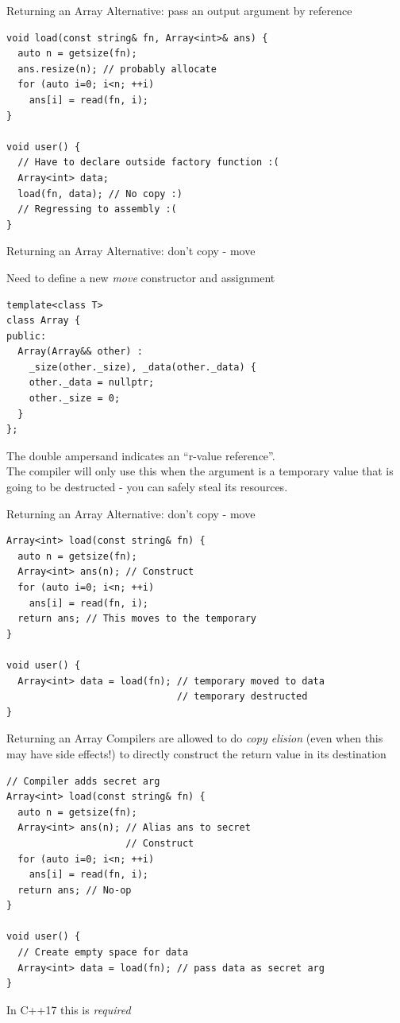 \documentclass[presentation,t]{beamer}
\begin{document}
\begin{frame}[fragile]{Returning an Array}
  Alternative: pass an output argument by reference
\begin{lstlisting}
void load(const string& fn, Array<int>& ans) {
  auto n = getsize(fn);
  ans.resize(n); // probably allocate
  for (auto i=0; i<n; ++i)
    ans[i] = read(fn, i);
}

void user() {
  // Have to declare outside factory function :(
  Array<int> data;
  load(fn, data); // No copy :)
  // Regressing to assembly :(
}
\end{lstlisting}
\end{frame}

\begin{frame}[fragile]{Returning an Array}
  Alternative: don't copy - move

  Need to define a new \emph{move} constructor and assignment

\begin{lstlisting}
template<class T>
class Array {
public:
  Array(Array&& other) :
    _size(other._size), _data(other._data) {
    other._data = nullptr;
    other._size = 0;
  }
};
\end{lstlisting}

  The double ampersand indicates an ``r-value reference''. \\
  The compiler will only use this when the argument is a temporary
  value that is going to be destructed - you can safely steal its
  resources.
\end{frame}


\begin{frame}[fragile]{Returning an Array}
  Alternative: don't copy - move
\begin{lstlisting}
Array<int> load(const string& fn) {
  auto n = getsize(fn);
  Array<int> ans(n); // Construct
  for (auto i=0; i<n; ++i)
    ans[i] = read(fn, i);
  return ans; // This moves to the temporary
}

void user() {
  Array<int> data = load(fn); // temporary moved to data
                              // temporary destructed
}
\end{lstlisting}
\end{frame}

\begin{frame}[fragile]{Returning an Array}
  Compilers are allowed to do \emph{copy elision} (even when this may
  have side effects!) to directly construct the return value in its
  destination
\begin{lstlisting}
// Compiler adds secret arg 
Array<int> load(const string& fn) {
  auto n = getsize(fn);
  Array<int> ans(n); // Alias ans to secret
                     // Construct
  for (auto i=0; i<n; ++i)
    ans[i] = read(fn, i);
  return ans; // No-op
}

void user() {
  // Create empty space for data
  Array<int> data = load(fn); // pass data as secret arg          
}
\end{lstlisting}
In C++17 this is \emph{required}
\end{frame}



\end{document}
